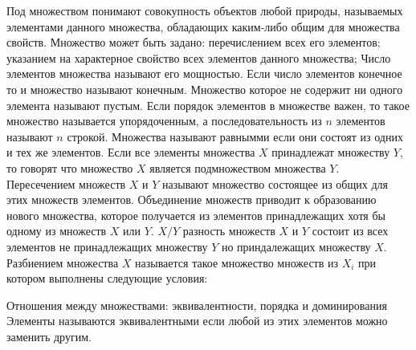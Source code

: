 \documentclass{article}
\begin{document}
Под множеством понимают совокупность объектов любой природы, называемых элементами данного множества, обладающих каким-либо общим для множества свойств.
Множество может быть задано: перечислением всех его элементов; указанием на характерное свойство всех элементов данного множества;
Число элементов множества называют его мощностью.
Если число элементов конечное то и множество называют конечным.
Множество которое не содержит ни одного элемента называют пустым. %
Если порядок элементов в множестве важен, то такое множество называется упорядоченным, а последовательность из $n$ элементов называют $n$ строкой.
Множества называют равнымми если они состоят из одних и тех же элементов. Если все элементы множества $X$ принадлежат множеству $Y$, то говорят что множество $X$ является подмножеством множества $Y$. %
Пересечением множеств $X$ и $Y$ называют множество состоящее из общих для этих множеств элементов.
Объединение множеств приводит к образованию нового множества, которое получается из элементов принадлежащих хотя бы одному из множеств $X$ или $Y$.
$X / Y$ разность множеств $X$ и $Y$ состоит из всех элементов не принадлежащих множеству $Y$ но приндалежащих множеству $X$.
Разбиением множества $X$ называется такое множество множеств из $X_i$ при котором выполнены следующие условия: %

Отношения между множествами: эквивалентности, порядка и доминирования %
Элементы называются эквивалентными если любой из этих элементов можно заменить другим.
\end{document}
